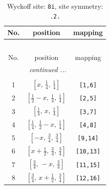 \documentclass[fleqn,8pt]{jsarticle}
\begin{document}
\begin{longtable}{ccc}
\caption{Wyckoff site: {\tt 8i}, site symmetry: {\tt .2.}}
 \\
 \hline \hline
No. & position & mapping \\ \hline \endfirsthead

\multicolumn{2}{l}{\tablename\ \thetable{}} \\
 \hline \hline
No. & position & mapping \\ \hline \endhead

 \hline \hline
\multicolumn{2}{r}{\footnotesize\it continued ...} \\ \endfoot

 \hline \hline
\multicolumn{2}{r}{} \\ \endlastfoot

1 & $\left[ x,\, \frac{1}{4},\, \frac{1}{4} \right]$ & {\tt [1,6]} \\ \hline
2 & $\left[ \frac{1}{2} - x,\, \frac{1}{4},\, \frac{1}{4} \right]$ & {\tt [2,5]} \\ \hline
3 & $\left[ \frac{1}{4},\, x,\, \frac{1}{4} \right]$ & {\tt [3,7]} \\ \hline
4 & $\left[ \frac{1}{4},\, \frac{1}{2} - x,\, \frac{1}{4} \right]$ & {\tt [4,8]} \\ \hline
5 & $\left[ - x,\, \frac{3}{4},\, \frac{3}{4} \right]$ & {\tt [9,14]} \\ \hline
6 & $\left[ x + \frac{1}{2},\, \frac{3}{4},\, \frac{3}{4} \right]$ & {\tt [10,13]} \\ \hline
7 & $\left[ \frac{3}{4},\, - x,\, \frac{3}{4} \right]$ & {\tt [11,15]} \\ \hline
8 & $\left[ \frac{3}{4},\, x + \frac{1}{2},\, \frac{3}{4} \right]$ & {\tt [12,16]} \\
\end{longtable}
\renewcommand{\arraystretch}{1.2}
\end{document}
